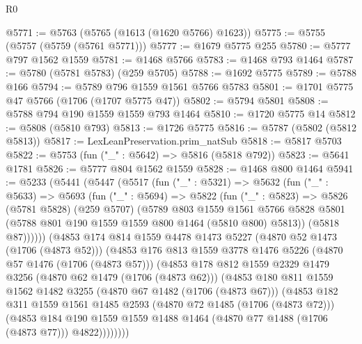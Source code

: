 \begin{lexlean}{R0}
\begin{coremodule}
@5771 := @5763 (@5765 (@1613 (@1620 @5766) @1623))
@5775 := @5755 (@5757 (@5759 (@5761 @5771)))
@5777 := @1679 @5775 @255
@5780 := @5777 @797 @1562 @1559
@5781 := @1468 @5766
@5783 := @1468 @793 @1464
@5787 := @5780 (@5781 @5783) (@259 @5705)
@5788 := @1692 @5775
@5789 := @5788 @166
@5794 := @5789 @796 @1559 @1561 @5766 @5783
@5801 := @1701 @5775 @47 @5766 (@1706 (@1707 @5775 @47))
@5802 := @5794 @5801
@5808 := @5788 @794 @190 @1559 @1559 @793 @1464
@5810 := @1720 @5775 @14
@5812 := @5808 (@5810 @793)
@5813 := @1726 @5775
@5816 := @5787 (@5802 (@5812 @5813))
@5817 := LexLeanPreservation.prim_natSub
@5818 := @5817 @5703
@5822 := @5753 (fun ("_" : @5642) => @5816 (@5818 @792))
@5823 := @5641 @1781
@5826 := @5777 @804 @1562 @1559
@5828 := @1468 @800 @1464
@5941 := @5233
    (@5441
      (@5447
        (@5517
          (fun ("_" : @5321) =>
          @5632
            (fun ("_" : @5633) =>
            @5693
              (fun ("_" : @5694) =>
              @5822
                (fun ("_" : @5823) =>
                @5826
                  (@5781 @5828)
                  (@259 @5707)
                  (@5789
                    @803
                    @1559
                    @1561
                    @5766
                    @5828
                    @5801
                    (@5788 @801 @190 @1559 @1559 @800 @1464 (@5810 @800) @5813))
                  (@5818 @87))))))
        (@4853
          @174
          @814
          @1559
          @4478
          @1473
          @5227
          (@4870 @52 @1473 (@1706 (@4873 @52)))
          (@4853
            @176
            @813
            @1559
            @3778
            @1476
            @5226
            (@4870 @57 @1476 (@1706 (@4873 @57)))
            (@4853
              @178
              @812
              @1559
              @2329
              @1479
              @3256
              (@4870 @62 @1479 (@1706 (@4873 @62)))
              (@4853
                @180
                @811
                @1559
                @1562
                @1482
                @3255
                (@4870 @67 @1482 (@1706 (@4873 @67)))
                (@4853
                  @182
                  @311
                  @1559
                  @1561
                  @1485
                  @2593
                  (@4870 @72 @1485 (@1706 (@4873 @72)))
                  (@4853
                    @184
                    @190
                    @1559
                    @1559
                    @1488
                    @1464
                    (@4870 @77 @1488 (@1706 (@4873 @77)))
                    @4822))))))))

\end{coremodule}
\end{lexlean}
